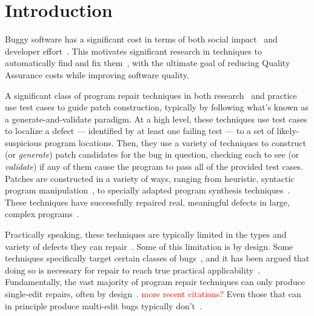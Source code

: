 \documentclass[sigconf, timestamp-false, anonymous=true]{acmart}
\newcommand\todo[1]{\textcolor{red}{#1}}
\begin{document}

\maketitle


\newcommand{\rqorinsight}[1]{
  \setlength{\fboxsep}{0.8em}
  \vspace{0.5em}
  \begin{center}
  \Ovalbox{\begin{minipage}{0.9\linewidth}
    \textbf{Research Question:} #1
    \end{minipage}}
  \end{center}
  \vspace{0.5em}}

\section{Introduction}

Buggy software has a significant cost in terms of both social impact~\cite{tricentis} 
and developer effort~\cite{cambridge-study}. This
motivates significant research in techniques to automatically find and fix
them~\cite{whatever}, with the ultimate goal of reducing Quality Assurance costs
while improving software quality. 

A significant class of program repair techniques in both
research~\cite{genprog,angelix,Le17, Xuan17} and practice~\cite{sapfix} use test cases to guide
patch construction, typically by following what's known as a
generate-and-validate paradigm. At a high level, these techniques use test cases
to localize a defect --- identified by at least one failing test --- to a set of
likely-suspicious program locations. Then, they use a variety of techniques to
construct (or \emph{generate}) patch candidates for the bug in question,
checking each to see (or \emph{validate}) if any of them cause the program to
pass all of the provided test cases.  
%
Patches are constructed in a variety of ways, ranging from heuristic, syntactic
program manipulation~\cite{syntax,examples}, to specially adapted program
synthesis techniques~\cite{examples}. These techniques have successfully
repaired real, meaningful defects in large, complex programs~\cite{examples}.

Practically speaking, these techniques are typically limited in the types and
variety of defects they can repair~\cite{for,example}. Some of this limitation
is by design. Some techniques specifically target certain classes of
bugs~\cite{nopol,sapfix}, and it has been argued that doing so is necessary for
repair to reach true practical applicability~\cite{maybe}. Fundamentally, the
vast majority of program repair techniques can only produce single-edit repairs,
often by design~\cite{rsrepair, ae, hdrepair}. \todo{more recent citations?}
Even those that can in principle produce multi-edit bugs typically
don't~\cite{poor,genprog}.
\end{document}
